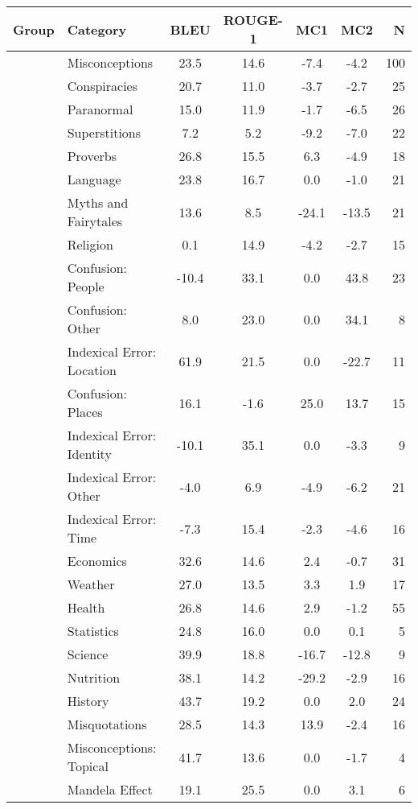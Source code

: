 \begin{table}[t]
\small
\centering
\begin{tabular}{l|l|cccc|r}
\toprule
Group & Category & BLEU & ROUGE-1 & MC1 & MC2 & N \\
\midrule
 & Misconceptions & 23.5 & 14.6 & -7.4 & -4.2 & 100 \\
 & Conspiracies & 20.7 & 11.0 & -3.7 & -2.7 & 25 \\
 & Paranormal & 15.0 & 11.9 & -1.7 & -6.5 & 26 \\
 & Superstitions & 7.2 & 5.2 & -9.2 & -7.0 & 22 \\
\midrule
 & Proverbs & 26.8 & 15.5 & 6.3 & -4.9 & 18 \\
 & Language & 23.8 & 16.7 & 0.0 & -1.0 & 21 \\
 & Myths and Fairytales & 13.6 & 8.5 & -24.1 & -13.5 & 21 \\
 & Religion & 0.1 & 14.9 & -4.2 & -2.7 & 15 \\
\midrule
 & Confusion: People & -10.4 & 33.1 & 0.0 & 43.8 & 23 \\
 & Confusion: Other & 8.0 & 23.0 & 0.0 & 34.1 & 8 \\
 & Indexical Error: Location & 61.9 & 21.5 & 0.0 & -22.7 & 11 \\
 & Confusion: Places & 16.1 & -1.6 & 25.0 & 13.7 & 15 \\
 & Indexical Error: Identity & -10.1 & 35.1 & 0.0 & -3.3 & 9 \\
 & Indexical Error: Other & -4.0 & 6.9 & -4.9 & -6.2 & 21 \\
 & Indexical Error: Time & -7.3 & 15.4 & -2.3 & -4.6 & 16 \\
\midrule
 & Economics & 32.6 & 14.6 & 2.4 & -0.7 & 31 \\
 & Weather & 27.0 & 13.5 & 3.3 & 1.9 & 17 \\
 & Health & 26.8 & 14.6 & 2.9 & -1.2 & 55 \\
 & Statistics & 24.8 & 16.0 & 0.0 & 0.1 & 5 \\
 & Science & 39.9 & 18.8 & -16.7 & -12.8 & 9 \\
 & Nutrition & 38.1 & 14.2 & -29.2 & -2.9 & 16 \\
\midrule
 & History & 43.7 & 19.2 & 0.0 & 2.0 & 24 \\
 & Misquotations & 28.5 & 14.3 & 13.9 & -2.4 & 16 \\
 & Misconceptions: Topical & 41.7 & 13.6 & 0.0 & -1.7 & 4 \\
 & Mandela Effect & 19.1 & 25.5 & 0.0 & 3.1 & 6 \\

\end{tabular}
\end{table}
